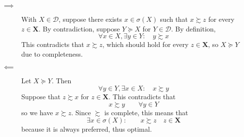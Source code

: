 \documentclass[12pt]{extarticle}
\numberwithin{table}{section}
\numberwithin{figure}{section}
\numberwithin{equation}{section}
\begin{document}
\begin{description}
	\item[$\implies$]
	      With $X \in \mathcal{D}$, suppose there exists $x \in \sigma(X)$ such that $x \succsim z$ for every $z \in \mathbf{X}$.
	      By contradiction, suppose $Y \succeq X$ for $Y \in \mathcal{D}$.
	      By definition,
	      \begin{equation}
		      \forall x \in X, \exists y \in Y\colon\quad y \succsim x
	      \end{equation}
	      This contradicts that $x \succsim z$, which should hold for every $z \in \mathbf{X}$, so $X \succeq Y$ due to completeness.
	\item[$\impliedby$]
	      Let $X \succeq Y$.
	      Then
	      \begin{equation}
		      \forall y \in Y, \exists x \in X\colon\quad x \succsim y
	      \end{equation}
	      Suppose that $z \succsim x$ for $z \in \mathbf{X}$.
	      This contradicts that
	      \begin{equation}
		      x \succsim y \qquad \forall y \in Y
	      \end{equation}
	      so we have $x \succsim z$. Since $\succsim$ is complete, this means that
	      \begin{equation}
		      \exists x \in \sigma(X) \colon\qquad x \succsim z \quad z \in \mathbf{X}
	      \end{equation}
	      because it is always preferred, thus optimal.
\end{description}
\end{document}
